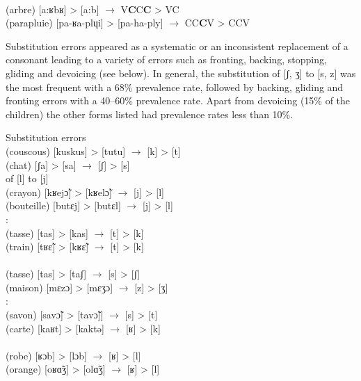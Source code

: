 \documentclass[output=paper,newtxmath,modfonts,nonflat,draftmode]{langsci/langscibook}
\begin{document}
\ex{}\\ 
(arbre)  [a:ʁbʁ] > [a:b] $\rightarrow$ V\textbf{C}C\textbf{C} > VC\\
(parapluie) [pa-ʁa-plɥi] > [pa-ha-ply] $\rightarrow$ CC\textbf{C}V > CCV\\
\z
\z

Substitution errors appeared as a systematic or an inconsistent replacement of a consonant leading to a variety of errors such as fronting, backing, stopping, gliding and devoicing (see  below). In general, the substitution of [ʃ, ʒ] to [s, z] was the most frequent with a 68\% prevalence rate, followed by backing, gliding and fronting errors with a 40--60\% prevalence rate. Apart from devoicing (15\% of the children) the other forms listed had prevalence rates less than 10\%.

\ea Substitution errors \label{ex:takam:substitution_errors}
\ea {}\\
(couscous) [kuskus] > [tutu] $\rightarrow$ [k] > [t]\\
(chat) [ʃa] > [sa] $\rightarrow$ [ʃ] > [s]\\

\ex{} {of} {[l]} {to} {[j]}\\
 (crayon) [kʁejɔ̃] > [kʁelɔ̃] $\rightarrow$ [j] > [l]\\ 
(bouteille) [butɛj] > [butɛl] $\rightarrow$ [j] > [l]\\

\ex{}: \\
(tasse) [tas] > [kas] $\rightarrow$ [t] > [k]\\
(train) [tʁɛ̃] > [kʁɛ̃] $\rightarrow$ [t] > [k]\\

\ex{}\\ 
(tasse) [tas] > [taʃ] $\rightarrow$ [s] > [ʃ]\\
(maison) [mɛzɔ] > [mɛʒɔ] $\rightarrow$ [z] > [ʒ] \\

\ex{}: \\
(savon) [savɔ̃] > [tavɔ̃]] $\rightarrow$ [s] > [t]\\ 
(carte) [kaʁt] > [kaktə] $\rightarrow$ [ʁ] > [k]\\

\ex{}\\
(robe) [ʁɔb] > [lɔb] $\rightarrow$ [ʁ] > [l]\\ 
(orange) [oʁɑ̃ʒ] > [olɑ̃ʒ] $\rightarrow$ [ʁ] > [l]\\
\end{document}
